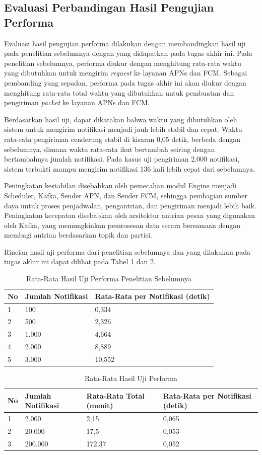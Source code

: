 \subsection{Evaluasi Perbandingan Hasil Pengujian Performa}
\par Evaluasi hasil pengujian performa dilakukan dengan membandingkan hasil uji pada penelitian sebelumnya dengan yang didapatkan pada tugas akhir ini. Pada penelitian sebelumnya, performa diukur dengan menghitung rata-rata waktu yang dibutuhkan untuk mengirim \textit{request} ke layanan APNs dan FCM. Sebagai pembanding yang sepadan, performa pada tugas akhir ini akan diukur dengan menghitung rata-rata total waktu yang dibutuhkan untuk pembuatan dan pengiriman \textit{packet} ke layanan APNs dan FCM.
\par Berdasarkan hasil uji, dapat dikatakan bahwa waktu yang dibutuhkan oleh sistem untuk mengirim notifikasi menjadi jauh lebih stabil dan cepat. Waktu rata-rata pengiriman cenderung stabil di kisaran 0,05 detik, berbeda dengan sebelumnya, dimana waktu rata-rata ikut bertambah seiring dengan bertambahnya jumlah notifikasi. Pada kasus uji pengiriman 2.000 notifikasi, sistem terbukti mampu mengirim notifikasi 136 kali lebih cepat dari sebelumnya.
\par Peningkatan kestabilan disebabkan oleh pemecahan modul Engine menjadi Scheduler, Kafka, Sender APN, dan Sender FCM, sehingga pembagian sumber daya untuk proses penjadwalan, pengantrian, dan pengiriman menjadi lebih baik. Peningkatan kecepatan disebabkan oleh arsitektur antrian pesan yang digunakan oleh Kafka, yang memungkinkan pemrosesan data secara bersamaan dengan membagi antrian berdasarkan topik dan partisi.
\par Rincian hasil uji performa dari penelitian sebelumnya dan yang dilakukan pada tugas akhir ini dapat dilihat pada Tabel \ref{t:performa-lama} dan \ref{t:performa-baru}.
\begin{longtable}{|p{0.5cm}|p{3cm}|p{2.5cm}|}
	\caption{Rata-Rata Hasil Uji Performa Penelitian Sebelumnya} \label{t:performa-lama} \\ \hline
	\rowcolor{lightgray} No & Jumlah Notifikasi & Rata-Rata per Notifikasi (detik) \\ \hline
	1 & 100 & 0,334 \\ \hline
	2 & 500 & 2,326 \\ \hline
	3 & 1.000 & 4,664 \\ \hline
	4 & 2.000 & 8,889 \\ \hline
	5 & 3.000 & 10,552 \\ \hline
\end{longtable}
\begin{longtable}{|p{0.5cm}|p{3cm}|p{2.5cm}|p{2.5cm}|}
	\caption{Rata-Rata Hasil Uji Performa} \label{t:performa-baru} \\ \hline
	\rowcolor{lightgray} No & Jumlah Notifikasi & Rata-Rata Total (menit) & Rata-Rata per Notifikasi (detik) \\ \hline
	1 & 2.000 & 2,15 & 0,065 \\ \hline
	2 & 20.000 & 17,5 & 0,053 \\ \hline
	3 & 200.000 & 172,37 & 0,052 \\ \hline
\end{longtable}

